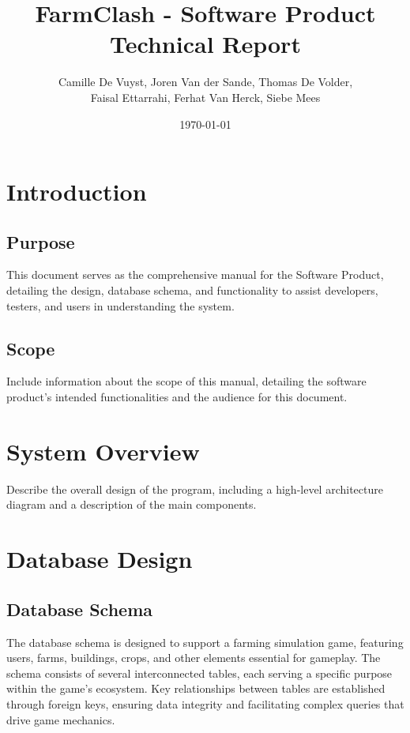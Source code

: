 \documentclass[12pt]{article}
\title{FarmClash - Software Product Technical Report}
\author{Camille De Vuyst, Joren Van der Sande, Thomas De Volder,\\ Faisal Ettarrahi, Ferhat Van Herck, Siebe Mees}
\date{\today}
\begin{document}
\maketitle
\tableofcontents
\newpage

\section{Introduction}
\subsection{Purpose}
This document serves as the comprehensive manual for the Software Product, detailing the design, database schema, and functionality to assist developers, testers, and users in understanding the system.

\subsection{Scope}
Include information about the scope of this manual, detailing the software product's intended functionalities and the audience for this document.

\section{System Overview}
Describe the overall design of the program, including a high-level architecture diagram and a description of the main components.

\section{Database Design}
\subsection{Database Schema}
The database schema is designed to support a farming simulation game, featuring users, farms, buildings, crops, and other elements essential for gameplay. The schema consists of several interconnected tables, each serving a specific purpose within the game's ecosystem. Key relationships between tables are established through foreign keys, ensuring data integrity and facilitating complex queries that drive game mechanics.
\end{document}
